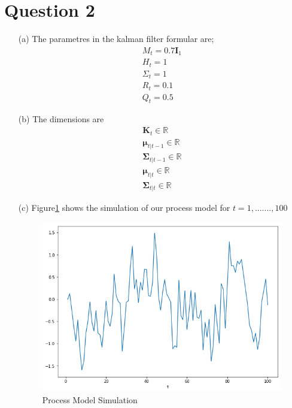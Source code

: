 \documentclass[12pt,a4paper]{article}
\newcommand{\R}{\mathbb{R}}
\begin{document}
\section*{Question 2}
\begin{itemize}
	\item [(a)] The parametres in the kalman filter formular are;
	\begin{align*}
	M_{t}=0.7\textbf{I}_{1}\\
	H_{t}=1\\
	\Sigma_{t}=1\\
	R_{t}=0.1\\
	Q_{t}=0.5
	\end{align*}
	\item [(b)] The dimensions are
	\begin{align*}
	\textbf{K}_{t}\in \R\\
	\boldsymbol{\mu}_{t|t-1}\in \R\\
	\boldsymbol{\Sigma}_{t|t-1}\in \R\\
	\boldsymbol{\mu}_{t|t}\in \R\\
	\boldsymbol{\Sigma}_{t|t}\in \R
	\end{align*}
	\newpage
	\item [(c)]Figure\ref{f1} shows the simulation of our process model for $t=1,.......,100$	
	\begin{figure}[h!]
		\centering
		\includegraphics[scale=0.5]{a.png}
		\caption{Process Model Simulation} \label{f1}
	\end{figure}
	

\end{itemize}
\end{document}
